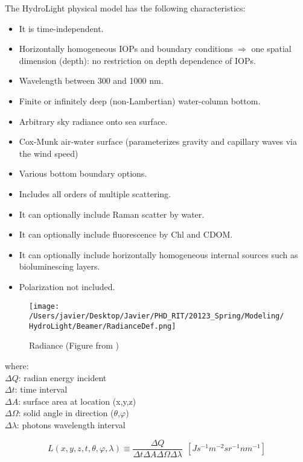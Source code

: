The HydroLight physical model has the following characteristics:

\begin{itemize}
	\item It is time-independent.
	\item Horizontally homogeneous IOPs and boundary conditions $\Rightarrow$ one spatial dimension (depth): no restriction on depth dependence of IOPs.
	\item Wavelength between 300 and 1000 nm.
	\item Finite or infinitely deep (non-Lambertian) water-column bottom.
	\item Arbitrary sky radiance onto sea surface.
	\item Cox-Munk air-water surface (parameterizes gravity and capillary waves via the wind speed)
	\item Various bottom boundary options.
	\item Includes all orders of multiple scattering.
	\item It can optionally include Raman scatter by water.
	\item It can optionally include fluorescence by Chl and CDOM.
	\item It can optionally include horizontally homogeneous internal sources such as bioluminescing layers.
	\item Polarization not included.
\end{itemize}

\begin{figure}[H]
	\centering
	\texttt{[image: /Users/javier/Desktop/Javier/PHD\_RIT/20123\_Spring/Modeling/HydroLight/Beamer/RadianceDef.png]}
\caption{Radiance (Figure from \cite{Mobley:2001}) \label{fig:radiance} } 
\end{figure}
where:\\
			\noindent $\Delta Q$: radian energy incident \\
			$\Delta t$: time interval \\
			$\Delta A$: surface area at location (x,y,z)\\
			$\Delta\Omega$: solid angle in direction ($\theta$,$\varphi$) \\
			$\Delta\lambda$: photons wavelength interval

\begin{equation}
	L(x,y,z,t,\theta,\varphi,\lambda)\equiv\frac{\Delta Q}{\Delta t\Delta A\Delta\Omega\Delta\lambda}~~\left[ Js^{-1}m^{-2}sr^{-1}nm^{-1} \right]
\end{equation}

